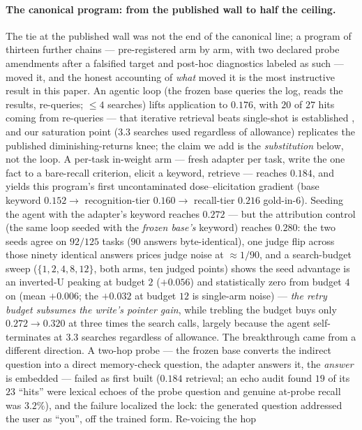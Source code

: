 \documentclass[11pt]{article}
\begin{document}
\paragraph{The canonical program: from the published wall to half the ceiling.} The tie at
the published wall was not the end of the canonical line; a program of thirteen further
chains --- pre-registered arm by arm, with two declared probe amendments after a falsified
target and post-hoc diagnostics labeled as such --- moved it, and the honest accounting of
\emph{what} moved it is the most instructive result in this paper. An agentic loop (the frozen base queries the log,
reads the results, re-queries; $\le 4$ searches) lifts application to $0.176$, with $20$ of
$27$ hits coming from re-queries --- that iterative retrieval beats single-shot is
established \citep{fishing2025iterative}, and our saturation point ($3.3$ searches used regardless
of allowance) replicates the published diminishing-returns knee; the claim we add is the
\emph{substitution} below, not the loop. A per-task in-weight arm --- fresh adapter per task,
write the one fact to a bare-recall criterion, elicit a keyword, retrieve --- reaches
$0.184$, and yields this program's first uncontaminated dose--elicitation gradient (base
keyword $0.152 \to$ recognition-tier $0.160 \to$ recall-tier $0.216$ gold-in-6). Seeding
the agent with the adapter's keyword reaches $0.272$ --- but the attribution control (the
same loop seeded with the \emph{frozen base's} keyword) reaches $0.280$: the two seeds
agree on $92/125$ tasks ($90$ answers byte-identical), one judge flip across those ninety
identical answers prices judge noise at
$\approx 1/90$, and a search-budget sweep ($\{1,2,4,8,12\}$, both arms, ten judged points)
shows the seed advantage is an inverted-U peaking at budget $2$ ($+0.056$) and
statistically zero from budget $4$ on (mean $+0.006$; the $+0.032$ at budget $12$ is
single-arm noise) --- \emph{the retry budget subsumes the write's pointer gain}, while
trebling the budget buys only $0.272 \to 0.320$ at three times the search calls, largely
because the agent self-terminates at $3.3$ searches regardless of allowance. The breakthrough came from a different direction. A two-hop probe
--- the frozen base converts the indirect question into a direct memory-check question, the
adapter answers it, the \emph{answer} is embedded --- failed as first built ($0.184$
retrieval; an echo audit found $19$ of its $23$ ``hits'' were lexical echoes of the probe
question and genuine at-probe recall was $3.2\%$), and the failure localized the lock: the
generated question addressed the user as ``you'', off the trained form. Re-voicing the hop
\end{document}
